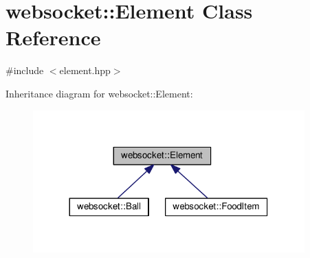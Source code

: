 \hypertarget{classwebsocket_1_1Element}{}\section{websocket\+:\+:Element Class Reference}
\label{classwebsocket_1_1Element}


{\ttfamily \#include $<$element.\+hpp$>$}



Inheritance diagram for websocket\+:\+:Element\+:\nopagebreak
\begin{figure}[H]
\begin{center}
\leavevmode
\includegraphics[width=296pt]{classwebsocket_1_1Element__inherit__graph}
\end{center}
\end{figure}
